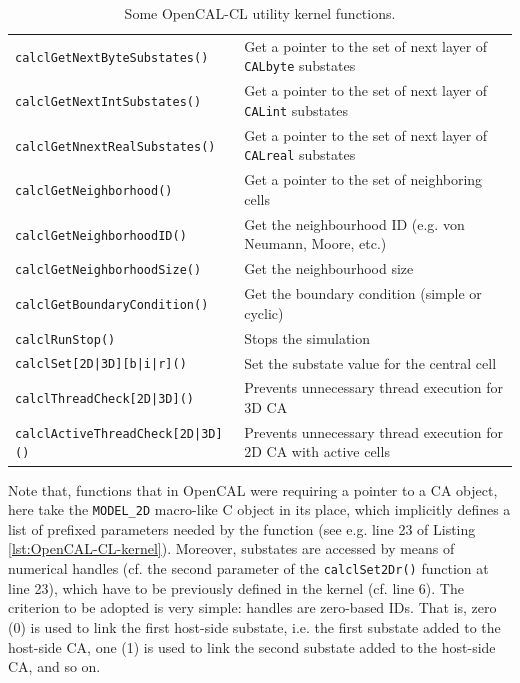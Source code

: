 \begin{table}
\begin{footnotesize}
\begin{tabular}{l|l}
    \verb'calclGetNextByteSubstates()'    & Get a pointer to the set of next layer of \verb'CALbyte' substates \\
    \verb'calclGetNextIntSubstates()'     & Get a pointer to the set of next layer of \verb'CALint' substates \\
    \verb'calclGetNnextRealSubstates()'   & Get a pointer to the set of next layer of \verb'CALreal' substates \\
    \verb'calclGetNeighborhood()'         & Get a pointer to the set of neighboring cells \\
    \verb'calclGetNeighborhoodID()'       & Get the neighbourhood ID (e.g. von Neumann, Moore, etc.) \\
    \verb'calclGetNeighborhoodSize()'     & Get the neighbourhood size \\
    \verb'calclGetBoundaryCondition()'    & Get the boundary condition (simple or cyclic) \\
    \verb'calclRunStop()'                 & Stops the simulation \\
    \verb'calclSet[2D|3D][b|i|r]()'       & Set the substate value for the central cell\\
    \verb'calclThreadCheck[2D|3D]()'      & Prevents unnecessary thread execution for 3D CA\\
    \verb'calclActiveThreadCheck[2D|3D]()'& Prevents unnecessary thread execution for 2D CA with active cells\\
    \hline
    \end{tabular}
    \end{footnotesize}
  \caption{Some OpenCAL-CL utility kernel functions.}
  \label{tab:kernel-utility-function}
\end{table}

Note that, functions that in OpenCAL were requiring a pointer to a CA
object, here take the \verb'MODEL_2D' macro-like C object in its
place, which implicitly defines a list of prefixed parameters needed
by the function (see e.g. line 23 of Listing
\ref{lst:OpenCAL-CL-kernel}). Moreover, substates are accessed by means
of numerical handles (cf. the second parameter of the
\verb'calclSet2Dr()' function at line 23), which have to be previously
defined in the kernel (cf. line 6). The criterion to be adopted
is very simple: handles are zero-based IDs. That is, zero (0) is used to link the
first host-side substate, i.e. the first substate added to the
host-side CA, one (1) is used to link the second substate added to the
host-side CA, and so on.

